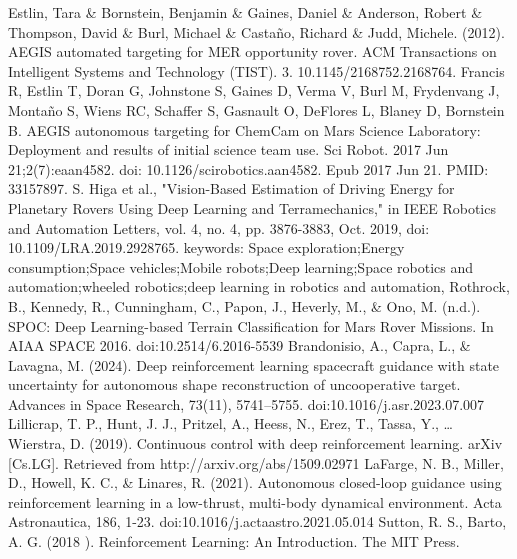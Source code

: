 \documentclass[conference]{IEEEtran}
\begin{document}
\begin{thebibliography}{00}
 Estlin, Tara \& Bornstein, Benjamin \& Gaines, Daniel \& Anderson, Robert \& Thompson, David \& Burl, Michael \& Castaño, Richard \& Judd, Michele. (2012). AEGIS automated targeting for MER opportunity rover. ACM Transactions on Intelligent Systems and Technology (TIST). 3. 10.1145/2168752.2168764.
 Francis R, Estlin T, Doran G, Johnstone S, Gaines D, Verma V, Burl M, Frydenvang J, Montaño S, Wiens RC, Schaffer S, Gasnault O, DeFlores L, Blaney D, Bornstein B. AEGIS autonomous targeting for ChemCam on Mars Science Laboratory: Deployment and results of initial science team use. Sci Robot. 2017 Jun 21;2(7):eaan4582. doi: 10.1126/scirobotics.aan4582. Epub 2017 Jun 21. PMID: 33157897.
 S. Higa et al., "Vision-Based Estimation of Driving Energy for Planetary Rovers Using Deep Learning and Terramechanics," in IEEE Robotics and Automation Letters, vol. 4, no. 4, pp. 3876-3883, Oct. 2019, doi: 10.1109/LRA.2019.2928765.
keywords: {Space exploration;Energy consumption;Space vehicles;Mobile robots;Deep learning;Space robotics and automation;wheeled robotics;deep learning in robotics and automation},
 Rothrock, B., Kennedy, R., Cunningham, C., Papon, J., Heverly, M., \& Ono, M. (n.d.). SPOC: Deep Learning-based Terrain Classification for Mars Rover Missions. In AIAA SPACE 2016. doi:10.2514/6.2016-5539
 Brandonisio, A., Capra, L., \& Lavagna, M. (2024). Deep reinforcement learning spacecraft guidance with state uncertainty for autonomous shape reconstruction of uncooperative target. Advances in Space Research, 73(11), 5741–5755. doi:10.1016/j.asr.2023.07.007
 Lillicrap, T. P., Hunt, J. J., Pritzel, A., Heess, N., Erez, T., Tassa, Y., … Wierstra, D. (2019). Continuous control with deep reinforcement learning. arXiv [Cs.LG]. Retrieved from http://arxiv.org/abs/1509.02971
 LaFarge, N. B., Miller, D., Howell, K. C., \& Linares, R. (2021). Autonomous closed-loop guidance using reinforcement learning in a low-thrust, multi-body dynamical environment. Acta Astronautica, 186, 1-23. doi:10.1016/j.actaastro.2021.05.014
 Sutton, R. S., Barto, A. G. (2018 ). Reinforcement Learning: An Introduction. The MIT Press.
\end{thebibliography}
\end{document}
